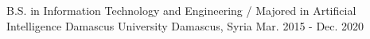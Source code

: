 

\begin{cventries}

  \cventry
    {B.S. in Information Technology and Engineering / Majored in Artificial Intelligence} %
    {Damascus University} %
    {Damascus, Syria} %
    {Mar. 2015 - Dec. 2020} %
    {}

\end{cventries}
